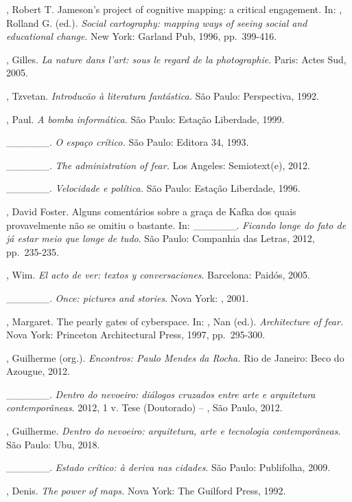 \begin{Parskip}
, Robert T. Jameson's project of cognitive mapping: a critical
engagement. In: , Rolland G. (ed.). \emph{Social cartography:
mapping ways of seeing social and educational change}. New York: Garland
Pub, 1996, pp.~399-416.

, Gilles. \emph{La nature dans l'art: sous le regard de la
photographie}. Paris: Actes Sud, 2005.

, Tzvetan. \emph{Introducão à literatura fantástica.} São
Paulo: Perspectiva, 1992.

, Paul. \emph{A bomba informática.} São Paulo: Estação
Liberdade, 1999.

\_\_\_\_\_\_. \emph{O espaço crítico.} São Paulo: Editora 34, 1993.

\_\_\_\_\_\_. \emph{The administration of fear.} Los Angeles: Semiotext(e), 2012.

\_\_\_\_\_\_. \emph{Velocidade e política.} São Paulo: Estação
Liberdade, 1996.

, David Foster. Alguns comentários sobre a graça de Kafka dos
quais provavelmente não se omitiu o bastante. In: \_\_\_\_\_\_.
\emph{Ficando longe do fato de já estar meio que longe de tudo}. São
Paulo: Companhia das Letras, 2012, pp.~235-235.

, Wim. \emph{El acto de ver: textos y conversaciones}.
Barcelona: Paidós, 2005.

\_\_\_\_\_\_. \emph{Once: pictures and stories}. Nova York:
, 2001.

, Margaret. The pearly gates of cyberspace. In: , Nan
(ed.). \emph{Architecture of fear.} Nova York: Princeton Architectural
Press, 1997, pp.~295-300.

, Guilherme (org.). \emph{Encontros: Paulo Mendes da Rocha.} Rio de
Janeiro: Beco do Azougue, 2012.

\_\_\_\_\_\_. \emph{Dentro do nevoeiro: diálogos cruzados entre
arte e arquitetura contemporâneas}. 2012, 1 v. Tese (Doutorado) -- ,
São Paulo, 2012.

, Guilherme. \emph{Dentro do nevoeiro: arquitetura, arte e
tecnologia contemporâneas}. São Paulo: Ubu, 2018.

\_\_\_\_\_\_. \emph{Estado crítico: à deriva nas cidades}. São
Paulo: Publifolha, 2009.

, Denis. \emph{The power of maps.} Nova York: The Guilford Press,
1992.
\end{Parskip}

